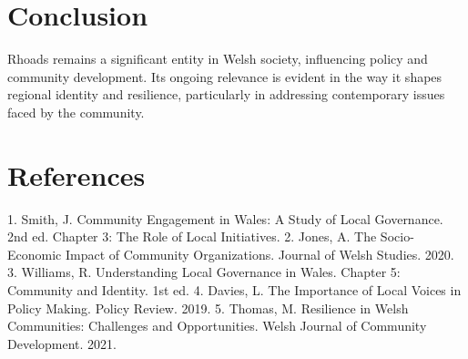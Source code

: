 \documentclass[a4paper]{article}
\begin{document}
\section{Conclusion}
Rhoads remains a significant entity in Welsh society, influencing policy and community development. Its ongoing relevance is evident in the way it shapes regional identity and resilience, particularly in addressing contemporary issues faced by the community.

\section{References}
1. Smith, J. Community Engagement in Wales: A Study of Local Governance. 2nd ed. Chapter 3: The Role of Local Initiatives.
2. Jones, A. The Socio-Economic Impact of Community Organizations. Journal of Welsh Studies. 2020.
3. Williams, R. Understanding Local Governance in Wales. Chapter 5: Community and Identity. 1st ed.
4. Davies, L. The Importance of Local Voices in Policy Making. Policy Review. 2019.
5. Thomas, M. Resilience in Welsh Communities: Challenges and Opportunities. Welsh Journal of Community Development. 2021.
\end{document}
